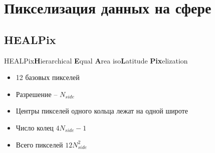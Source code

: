 \documentclass{beamer}
\begin{document}
\section{Пикселизация данных на сфере}
\subsection{HEALPix}
\begin{frame}{HEALPix}{\textbf{H}ierarchical \textbf{E}qual \textbf{A}rea iso\textbf{L}atitude \textbf{Pix}elization}
\begin{itemize}
\item 12 базовых пикселей
\item Разрешение -- $N_{side}$
\item Центры пикселей одного кольца лежат на одной широте
\item Число колец $4N_{side}-1$
\item Всего пикселей $12N_{side}^2$
\end{itemize}
\end{frame}


\end{document}
